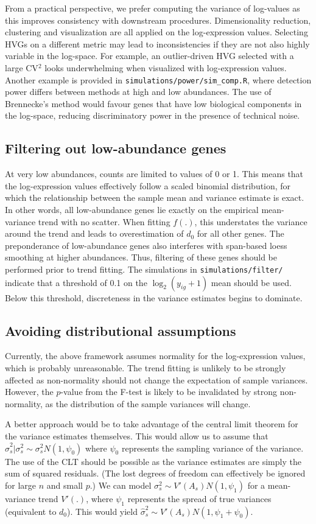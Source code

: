 \documentclass{article}
\begin{document}
From a practical perspective, we prefer computing the variance of log-values as this improves consistency with downstream procedures.
Dimensionality reduction, clustering and visualization are all applied on the log-expression values.
Selecting HVGs on a different metric may lead to inconsistencies if they are not also highly variable in the log-space.
For example, an outlier-driven HVG selected with a large CV$^2$ looks underwhelming when visualized with log-expression values.
Another example is provided in \texttt{simulations/power/sim\_comp.R}, where detection power differs between methods at high and low abundances.
The use of Brennecke's method would favour genes that have low biological components in the log-space, reducing discriminatory power in the presence of technical noise.

\subsection{Filtering out low-abundance genes}
At very low abundances, counts are limited to values of 0 or 1.
This means that the log-expression values effectively follow a scaled binomial distribution, for which the relationship between the sample mean and variance estimate is exact.
In other words, all low-abundance genes lie exactly on the empirical mean-variance trend with no scatter.
When fitting $f(.)$, this understates the variance around the trend and leads to overestimation of $d_0$ for all other genes.
The preponderance of low-abundance genes also interferes with span-based loess smoothing at higher abundances.
Thus, filtering of these genes should be performed prior to trend fitting.
The simulations in \texttt{simulations/filter/} indicate that a threshold of 0.1 on the $\log_2(y_{ig}+1)$ mean should be used.
Below this threshold, discreteness in the variance estimates begins to dominate.

\subsection{Avoiding distributional assumptions}
Currently, the above framework assumes normality for the log-expression values, which is probably unreasonable.
The trend fitting is unlikely to be strongly affected as non-normality should not change the expectation of sample variances.
However, the $p$-value from the F-test is likely to be invalidated by strong non-normality, as the distribution of the sample variances will change.

A better approach would be to take advantage of the central limit theorem for the variance estimates themselves.
This would allow us to assume that $\hat\sigma^2_s|\sigma^2_s \sim \sigma^2_s N(1, \psi_0)$ where $\psi_0$ represents the sampling variance of the variance.
The use of the CLT should be possible as the variance estimates are simply the sum of squared residuals.
(The lost degrees of freedom can effectively be ignored for large $n$ and small $p$.)
We can model $\sigma^2_s \sim V'(A_s)N(1, \psi_1)$ for a mean-variance trend $V'(.)$, where $\psi_1$ represents the spread of true variances (equivalent to $d_0$).
This would yield $\hat\sigma^2_s \sim V'(A_s)N(1, \psi_1 + \psi_0)$.
\end{document}
